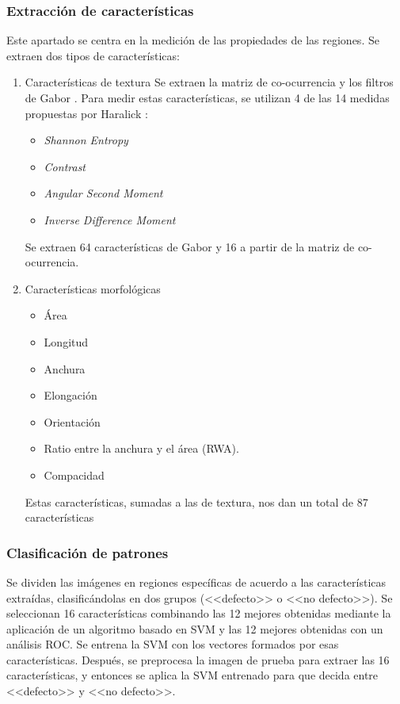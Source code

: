 \subsubsection{Extracción de características}
Este apartado se centra en la medición de las propiedades de las regiones. Se extraen dos tipos de características:
	\begin{enumerate}
	\item Características de textura
	Se extraen la matriz de co-ocurrencia y los filtros de Gabor \cite{daugman1988complete}. Para medir estas características, se utilizan 4 de las 14 medidas propuestas por Haralick \cite{haralick1973textural}:
		\begin{itemize}
		\item \emph{Shannon Entropy}
		\item \emph{Contrast}
		\item \emph{Angular Second Moment}
		\item \emph{Inverse Difference Moment}
		\end{itemize}
	Se extraen 64 características de Gabor y 16 a partir de la matriz de co-ocurrencia.

	\item Características morfológicas
		\begin{itemize}
		\item Área
		\item Longitud
		\item Anchura
		\item Elongación
		\item Orientación
		\item Ratio entre la anchura y el área (RWA).
		\item Compacidad
		\end{itemize}
	
	Estas características, sumadas a las de textura, nos dan un total de 87 características
	\end{enumerate}


\subsubsection{Clasificación de patrones}
Se dividen las imágenes en regiones específicas de acuerdo a las características extraídas, clasificándolas en dos grupos (<<defecto>> o <<no defecto>>).
Se seleccionan 16 características combinando las 12 mejores obtenidas mediante la aplicación de un algoritmo basado en SVM y las 12 mejores obtenidas con un análisis ROC.
Se entrena la SVM con los vectores formados por esas características.
Después, se preprocesa la imagen de prueba para extraer las 16 características, y entonces se aplica la SVM entrenado para que decida entre <<defecto>> y <<no defecto>>.
